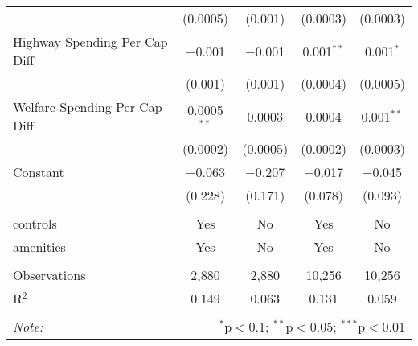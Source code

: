 \begin{table}[!htbp]
\begin{tabular}{@{\extracolsep{5pt}}lcccc}
  & (0.0005) & (0.001) & (0.0003) & (0.0003) \\ 
  Highway Spending Per Cap Diff & $-$0.001 & $-$0.001 & 0.001$^{**}$ & 0.001$^{*}$ \\ 
  & (0.001) & (0.001) & (0.0004) & (0.0005) \\ 
  Welfare Spending Per Cap Diff & 0.0005$^{**}$ & 0.0003 & 0.0004 & 0.001$^{**}$ \\ 
  & (0.0002) & (0.0005) & (0.0002) & (0.0003) \\ 
  Constant & $-$0.063 & $-$0.207 & $-$0.017 & $-$0.045 \\ 
  & (0.228) & (0.171) & (0.078) & (0.093) \\ 
 \hline \\[-1.8ex] 
controls & Yes & No & Yes & No \\ 
amenities & Yes & No & Yes & No \\ 
\hline \\[-1.8ex] 
Observations & 2,880 & 2,880 & 10,256 & 10,256 \\ 
R$^{2}$ & 0.149 & 0.063 & 0.131 & 0.059 \\ 
\hline 
\hline \\[-1.8ex] 
\textit{Note:}  & \multicolumn{4}{r}{$^{*}$p$<$0.1; $^{**}$p$<$0.05; $^{***}$p$<$0.01} \\ 
\end{tabular} 
\end{table} 
